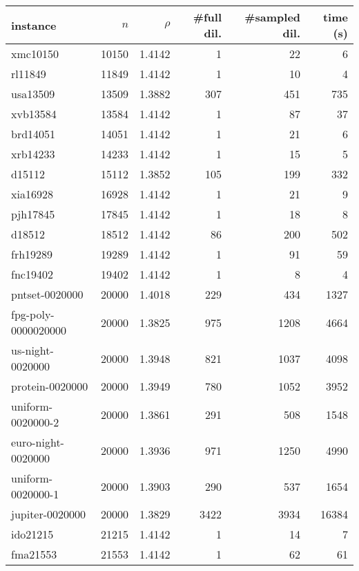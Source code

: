 \begin{tabular}{|lrrrrr|}
    \hline
    instance & $n$ & $\rho$ & \#full dil. & \#sampled dil. & \binmdt{} time (s) \\
    \hline
    xmc10150 & 10150 & \num{1.4142} & \num{1} & \num{22} & \num{6} \\
rl11849 & 11849 & \num{1.4142} & \num{1} & \num{10} & \num{4} \\
usa13509 & 13509 & \num{1.3882} & \num{307} & \num{451} & \num{735} \\
xvb13584 & 13584 & \num{1.4142} & \num{1} & \num{87} & \num{37} \\
brd14051 & 14051 & \num{1.4142} & \num{1} & \num{21} & \num{6} \\
xrb14233 & 14233 & \num{1.4142} & \num{1} & \num{15} & \num{5} \\
d15112 & 15112 & \num{1.3852} & \num{105} & \num{199} & \num{332} \\
xia16928 & 16928 & \num{1.4142} & \num{1} & \num{21} & \num{9} \\
pjh17845 & 17845 & \num{1.4142} & \num{1} & \num{18} & \num{8} \\
d18512 & 18512 & \num{1.4142} & \num{86} & \num{200} & \num{502} \\
frh19289 & 19289 & \num{1.4142} & \num{1} & \num{91} & \num{59} \\
fnc19402 & 19402 & \num{1.4142} & \num{1} & \num{8} & \num{4} \\
pntset-0020000 & 20000 & \num{1.4018} & \num{229} & \num{434} & \num{1327} \\
fpg-poly-0000020000 & 20000 & \num{1.3825} & \num{975} & \num{1208} & \num{4664} \\
us-night-0020000 & 20000 & \num{1.3948} & \num{821} & \num{1037} & \num{4098} \\
protein-0020000 & 20000 & \num{1.3949} & \num{780} & \num{1052} & \num{3952} \\
uniform-0020000-2 & 20000 & \num{1.3861} & \num{291} & \num{508} & \num{1548} \\
euro-night-0020000 & 20000 & \num{1.3936} & \num{971} & \num{1250} & \num{4990} \\
uniform-0020000-1 & 20000 & \num{1.3903} & \num{290} & \num{537} & \num{1654} \\
jupiter-0020000 & 20000 & \num{1.3829} & \num{3422} & \num{3934} & \num{16384} \\
ido21215 & 21215 & \num{1.4142} & \num{1} & \num{14} & \num{7} \\
fma21553 & 21553 & \num{1.4142} & \num{1} & \num{62} & \num{61} \\

\end{tabular}
